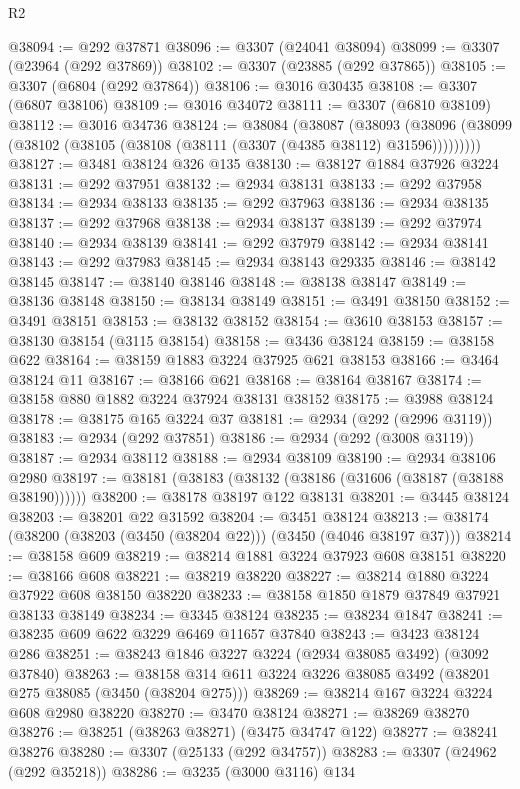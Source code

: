 \begin{lexlean}{R2}
\begin{coremodule}
@38094 := @292 @37871
@38096 := @3307 (@24041 @38094)
@38099 := @3307 (@23964 (@292 @37869))
@38102 := @3307 (@23885 (@292 @37865))
@38105 := @3307 (@6804 (@292 @37864))
@38106 := @3016 @30435
@38108 := @3307 (@6807 @38106)
@38109 := @3016 @34072
@38111 := @3307 (@6810 @38109)
@38112 := @3016 @34736
@38124 := @38084
    (@38087
      (@38093 (@38096 (@38099 (@38102 (@38105 (@38108 (@38111 (@3307 (@4385 @38112) @31596)))))))))
@38127 := @3481 @38124 @326 @135
@38130 := @38127 @1884 @37926 @3224
@38131 := @292 @37951
@38132 := @2934 @38131
@38133 := @292 @37958
@38134 := @2934 @38133
@38135 := @292 @37963
@38136 := @2934 @38135
@38137 := @292 @37968
@38138 := @2934 @38137
@38139 := @292 @37974
@38140 := @2934 @38139
@38141 := @292 @37979
@38142 := @2934 @38141
@38143 := @292 @37983
@38145 := @2934 @38143 @29335
@38146 := @38142 @38145
@38147 := @38140 @38146
@38148 := @38138 @38147
@38149 := @38136 @38148
@38150 := @38134 @38149
@38151 := @3491 @38150
@38152 := @3491 @38151
@38153 := @38132 @38152
@38154 := @3610 @38153
@38157 := @38130 @38154 (@3115 @38154)
@38158 := @3436 @38124
@38159 := @38158 @622
@38164 := @38159 @1883 @3224 @37925 @621 @38153
@38166 := @3464 @38124 @11
@38167 := @38166 @621
@38168 := @38164 @38167
@38174 := @38158 @880 @1882 @3224 @37924 @38131 @38152
@38175 := @3988 @38124
@38178 := @38175 @165 @3224 @37
@38181 := @2934 (@292 (@2996 @3119))
@38183 := @2934 (@292 @37851)
@38186 := @2934 (@292 (@3008 @3119))
@38187 := @2934 @38112
@38188 := @2934 @38109
@38190 := @2934 @38106 @2980
@38197 := @38181 (@38183 (@38132 (@38186 (@31606 (@38187 (@38188 @38190))))))
@38200 := @38178 @38197 @122 @38131
@38201 := @3445 @38124
@38203 := @38201 @22 @31592
@38204 := @3451 @38124
@38213 := @38174 (@38200 (@38203 (@3450 (@38204 @22))) (@3450 (@4046 @38197 @37)))
@38214 := @38158 @609
@38219 := @38214 @1881 @3224 @37923 @608 @38151
@38220 := @38166 @608
@38221 := @38219 @38220
@38227 := @38214 @1880 @3224 @37922 @608 @38150 @38220
@38233 := @38158 @1850 @1879 @37849 @37921 @38133 @38149
@38234 := @3345 @38124
@38235 := @38234 @1847
@38241 := @38235 @609 @622 @3229 @6469 @11657 @37840
@38243 := @3423 @38124 @286
@38251 := @38243 @1846 @3227 @3224 (@2934 @38085 @3492) (@3092 @37840)
@38263 := @38158 @314 @611 @3224 @3226 @38085 @3492 (@38201 @275 @38085 (@3450 (@38204 @275)))
@38269 := @38214 @167 @3224 @3224 @608 @2980 @38220
@38270 := @3470 @38124
@38271 := @38269 @38270
@38276 := @38251 (@38263 @38271) (@3475 @34747 @122)
@38277 := @38241 @38276
@38280 := @3307 (@25133 (@292 @34757))
@38283 := @3307 (@24962 (@292 @35218))
@38286 := @3235 (@3000 @3116) @134

\end{coremodule}
\end{lexlean}

